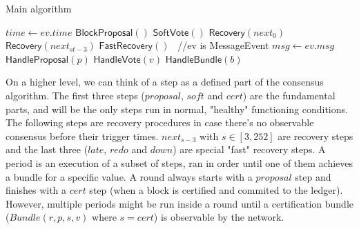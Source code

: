 \documentclass[10pt,a4paper]{article}
\begin{document}
\begin{section}{Main algorithm}


\begin{algorithm}[H]
    \begin{algorithmic}[1]
    
        \State $time \gets ev.time$
            \State $\mathsf{BlockProposal}()$
            \State $\mathsf{SoftVote}()$
            \State $\mathsf{Recovery}(next_0)$
            \State $\mathsf{Recovery}(next_{st-3})$
            \State $\mathsf{FastRecovery}()$
        \EndIf
    \Else \ //ev is MessageEvent
        \State $msg \gets ev.msg$
            \State $\mathsf{HandleProposal}(p)$
            \State $\mathsf{HandleVote}(v)$
            \State $\mathsf{HandleBundle}(b)$
        \EndIf
    \EndIf

    \EndFunction
    \end{algorithmic}
    \caption{\underline{Main node algorithm}}
\end{algorithm}

On a higher level, we can think of a step as a defined part of the consensus algorithm. The first three steps
($proposal$, $soft$ and $cert$)
are the fundamental parts, and will be the only steps run in normal, "healthy" functioning conditions.
The following steps are recovery procedures in case there's no observable consensus before their trigger times.
$next_{s-3}$ with $s \in [3, 252]$ are recovery steps and the last three ($late$, $redo$ and $down$)
are special "fast" recovery steps.
A period is an execution of a subset of steps, ran in order until one of them achieves 
a bundle for a specific value. A round always starts with a $proposal$ step and finishes with a $cert$
step (when a block is certified and commited to the ledger). However, multiple periods might
be run inside a round until a certification bundle ($Bundle(r,p,s,v) $ where $s = cert$) is observable by the network.
\\


\end{section}
\end{document}
